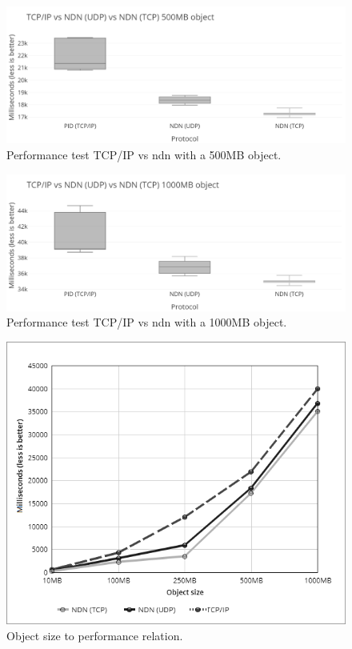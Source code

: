 \begin{figure}[H]
\centering
\includegraphics[scale=0.43]{Images/ndn_tcpip_500_grey.png}
\caption{Performance test TCP/IP vs \gls{ndn} with a 500MB object.}
\label{fig:perftest-4}
\end{figure}

\begin{figure}[H]
\centering
\includegraphics[scale=0.43]{Images/ndn_tcpip_1000_grey.png}
\caption{Performance test TCP/IP vs \gls{ndn} with a 1000MB object.}
\label{fig:perftest-5}
\end{figure}

\begin{figure}[H]
\centering
\includegraphics[scale=0.7]{Images/linechart5.png}
\caption{Object size to performance relation.}
\label{fig:perftest-6}
\end{figure}

